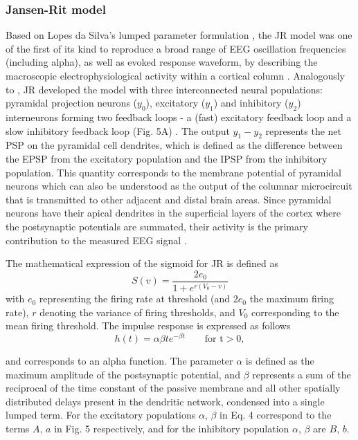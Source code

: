 \documentclass[12pt,twoside]{article}
\begin{document}
\subsubsection{Jansen-Rit model}
Based on Lopes da Silva’s lumped parameter formulation \citep{lopes1974model}, the JR model was one of the first of its kind to reproduce a broad range of EEG oscillation frequencies (including alpha), as well as evoked response waveform, by describing the macroscopic electrophysiological activity within a cortical column \citep{jansen1993neurophysiologically, jansen1995electroencephalogram}. Analogously to \citet{zetterberg1978performance}, JR developed the model with three interconnected neural populations: pyramidal projection neurons ($y_0$), excitatory ($y_1$) and inhibitory ($y_2$) interneurons forming two feedback loops - a (fast) excitatory feedback loop and a slow inhibitory feedback loop (Fig. 5A) \citep{Knösche2015}. The output  $y_1-y_2$ represents the net PSP on the pyramidal cell dendrites, which is defined as the difference between the EPSP from the excitatory population and the IPSP from the inhibitory population. This quantity corresponds to the membrane potential of pyramidal neurons which can also be understood as the output of the columnar microcircuit that is transmitted to other adjacent and distal brain areas. Since pyramidal neurons have their apical dendrites in the superficial layers of the cortex where the postsynaptic potentials are summated, their activity is the primary contribution to the measured EEG signal \citep{jansen1995electroencephalogram, grimbert2006analysis}.  

The mathematical expression of the sigmoid for JR is defined as
\begin{equation}
     S(v)=\frac{2e_0}{1+e^{r(V_0-v)}}
 \end{equation}
 with $e_{0}$ representing the firing rate at threshold (and $2e_{0}$ the maximum firing rate), $r$ denoting the variance of firing thresholds, and $V_{0}$ corresponding to the mean firing threshold. The impulse response is expressed as follows
 \begin{equation}
   h(t)=\alpha \beta te^{-\beta t}    \qquad \text{for t} > 0, 
 \end{equation}
 
 and corresponds to an alpha function. The parameter $\alpha$ is defined as the maximum amplitude of the postsynaptic potential, and $\beta$ represents a sum of the reciprocal of the time constant of the passive membrane and all other spatially distributed delays present in the dendritic network, condensed into a single lumped term. For the excitatory  populations $\alpha$, $\beta$ in Eq. 4 correspond to the terms $A$, $a$ in Fig. 5 respectively, and for the inhibitory population $\alpha$, $\beta$ are $B$, $b$.
 
\end{document}
